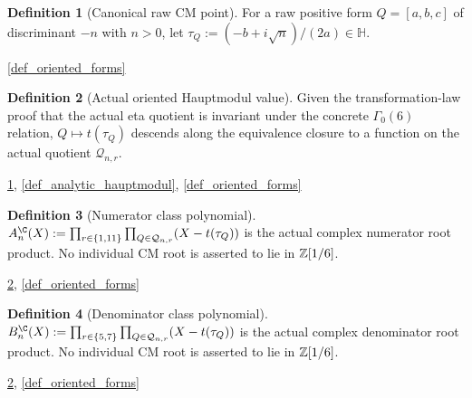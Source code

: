 \documentclass[11pt,a4paper]{article}
\numberwithin{equation}{section}
\theoremstyle{plain}\newtheorem{theorem}{Theorem}[section]\newaliascnt{proposition}{theorem}\newtheorem{proposition}[proposition]{Proposition}\aliascntresetthe{proposition}\newaliascnt{lemma}{theorem}\newtheorem{lemma}[lemma]{Lemma}\aliascntresetthe{lemma}
\theoremstyle{definition}\newaliascnt{definition}{theorem}\newtheorem{definition}[definition]{Definition}\aliascntresetthe{definition}\newaliascnt{notation}{theorem}\newtheorem{notation}[notation]{Notation}\aliascntresetthe{notation}
\providecommand{\lean}[1]{}\providecommand{\leanok}{}
\begin{document}
\begin{definition}[Canonical raw CM point]\label{def_raw_cm_point}\lean{SptCM.CM.Repaired.rawCMUpperHalfPlane}\leanok
For a raw positive form $Q=[a,b,c]$ of discriminant $-n$ with $n>0$, let
$\tau_Q:=(-b+i\sqrt n)/(2a)\in\mathbb H$.
\end{definition}
\begin{uses-statement}\ref{def_oriented_forms}\end{uses-statement}
\begin{definition}[Actual oriented Hauptmodul value]\label{def_actual_oriented_cm_value}\lean{SptCM.CM.Repaired.actualOrientedHauptmodulValue}\leanok
Given the transformation-law proof that the actual eta quotient is invariant
under the concrete $\Gamma_0(6)$ relation, $Q\mapsto t(\tau_Q)$ descends along
the equivalence closure to a function on the actual quotient
$\mathcal Q_{n,r}$.
\end{definition}
\begin{uses-statement}\ref{def_raw_cm_point}, \ref{def_analytic_hauptmodul}, \ref{def_oriented_forms}\end{uses-statement}
\begin{definition}[Numerator class polynomial]\label{def_class_poly_a}\lean{SptCM.CM.Repaired.ActualOrientedCMCoordinates.actualNumeratorPolynomial}\leanok
$A_n^{\C}(X):=\prod_{r\in\{1,11\}}\prod_{Q\in\mathcal Q_{n,r}}(X-t(\tau_Q))$ is the actual complex numerator root product.  No individual CM root is asserted to lie in $\mathbb Z[1/6]$.
\end{definition}
\begin{uses-statement}\ref{def_actual_oriented_cm_value}, \ref{def_oriented_forms}\end{uses-statement}
\begin{definition}[Denominator class polynomial]\label{def_class_poly_b}\lean{SptCM.CM.Repaired.ActualOrientedCMCoordinates.actualDenominatorPolynomial}\leanok
$B_n^{\C}(X):=\prod_{r\in\{5,7\}}\prod_{Q\in\mathcal Q_{n,r}}(X-t(\tau_Q))$ is the actual complex denominator root product.  No individual CM root is asserted to lie in $\mathbb Z[1/6]$.
\end{definition}
\begin{uses-statement}\ref{def_actual_oriented_cm_value}, \ref{def_oriented_forms}\end{uses-statement}
\end{document}
